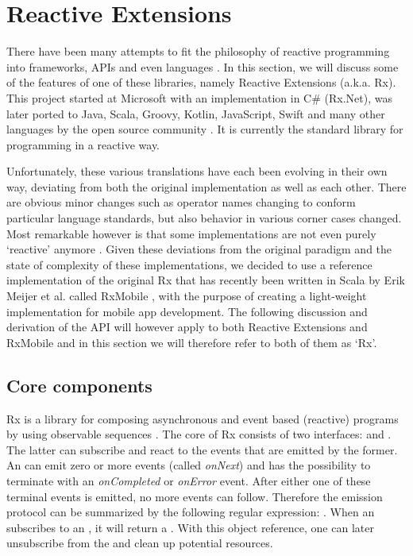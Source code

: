 \section{Reactive Extensions}
\label{sec:pure-rx-interfaces}
There have been many attempts to fit the philosophy of reactive programming into frameworks, APIs and even languages \cite{ReactiveX, meijer2015-Dart, Reactive-Streams, Akka, Elm, RxMobile}. In this section, we will discuss some of the features of one of these libraries, namely Reactive Extensions (a.k.a. Rx). This project started at Microsoft with an implementation in C\# \cite{meijer2010-Observable} (Rx.Net), was later ported to Java, Scala, Groovy, Kotlin, JavaScript, Swift and many other languages by the open source community \cite{ReactiveX}. It is currently the standard library for programming in a reactive way.

Unfortunately, these various translations have each been evolving in their own way, deviating from both the original implementation as well as each other. There are obvious minor changes such as operator names changing to conform particular language standards, but also behavior in various corner cases changed. Most remarkable however is that some implementations are not even purely `reactive' anymore \cite{meijer2014-Derivation}. Given these deviations from the original paradigm and the state of complexity of these implementations, we decided to use a reference implementation of the original Rx that has recently been written in Scala by Erik Meijer et al. called RxMobile \cite{RxMobile}, with the purpose of creating a light-weight implementation for mobile app development. The following discussion and derivation of the API will however apply to both Reactive Extensions and RxMobile and in this section we will therefore refer to both of them as `Rx'.

\subsection{Core components}
\label{subsec:core-comps}
Rx is a library for composing asynchronous and event based (reactive) programs by using observable sequences \cite{Rx-Codeplex}. The core of Rx consists of two interfaces: \obs and \obv. The latter can subscribe and react to the events that are emitted by the former. An \obs can emit zero or more events (called \textit{onNext}) and has the possibility to terminate with an \textit{onCompleted} or \textit{onError} event. After either one of these terminal events is emitted, no more events can follow. Therefore the emission protocol can be summarized by the following regular expression:  \cite{MS2010-RxDesign}. When an \obv subscribes to an \obs, it will return a \subs. With this object reference, one can later unsubscribe from the \obs and clean up potential resources.

